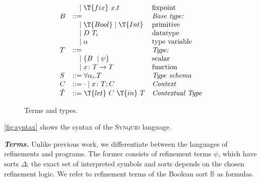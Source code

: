 \documentclass[10pt,preprint]{sigplanconf-pldi16}
\theoremstyle{definition}
\newcommand{\custompar}[1]{\parskip 0pt \textbf{\textit{#1}}}
\newcommand{\funT}[3]{{#1}\colon {#2} \to {#3}}
\newcommand{\contT}[2]{\T{let}\ {#1}\ \T{in}\ {#2}}
\newcommand{\lang}{\textsc{Synquid}\xspace}
\begin{document}
\begin{figure}
$$\begin{array}{llll}
  &\quad   \mid \T{fix}\ x.t                                                                & \text{fixpoint}\\  
B &::=                                                                                      & \text{\emph{Base type:}}\\  
  &\quad   \mid \T{Bool}\mid \T{Int}                                                        & \text{primitive}\\   
  &\quad   \mid D\ T_i                                                                      & \text{datatype}\\  
  &\quad   \mid \alpha                                                                      & \text{type variable}\\
T &::=                                                                                      & \text{\emph{Type:}}\\
  &\quad  \mid \{B\ \mid\psi\}                                                              & \text{scalar}\\
  &\quad  \mid \funT{x}{T}{T}                                                               & \text{function}\\
S &::=  \forall\alpha_i.T                                                                   & \text{\emph{Type schema}}\\
C &::=  \cdot \mid x\colon T;C                                                              & \text{\emph{Context}}\\
\hat{T} &::=  \contT{C}{T}                                                                  & \text{\emph{Contextual Type}}
\end{array}
$$
\caption{Terms and types.}\label{fig:syntax}
\end{figure}

\autoref{fig:syntax} shows the syntax of the \lang language.

\custompar{Terms.}
Unlike previous work, we differentiate between the languages of refinements and programs.
The former consists of refinement terms $\psi$, which have sorts $\Delta$;
the exact set of interpreted symbols and sorts depends on the chosen refinement logic.
We refer to refinement terms of the Boolean sort $\mathbb{B}$ as formulas.
\end{document}
